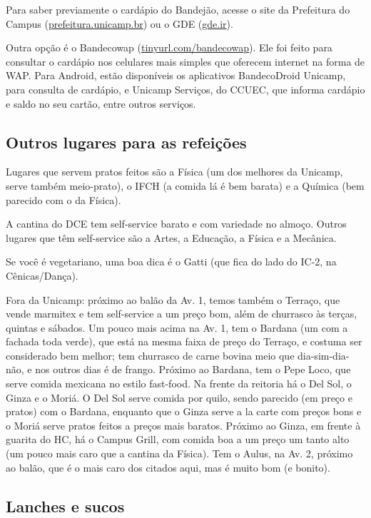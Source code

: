 Para saber previamente o cardápio do Bandejão, acesse o site da Prefeitura do
Campus (\url{prefeitura.unicamp.br}) ou o GDE (\url{gde.ir}).

Outra opção é o Bandecowap (\url{tinyurl.com/bandecowap}). Ele foi feito
para consultar o cardápio nos celulares mais simples que oferecem internet na forma
de WAP. Para Android, estão disponíveis os aplicativos BandecoDroid Unicamp,
para consulta de cardápio, e Unicamp Serviços, do CCUEC, que informa cardápio
e saldo no seu cartão, entre outros serviços.

\subsection{Outros lugares para as refeições}

Lugares que servem pratos feitos são a Física (um dos melhores da Unicamp, serve
também meio-prato), o IFCH (a comida lá é bem barata) e a Química (bem parecido
com o da Física).

A cantina do DCE tem self-service barato e com variedade no almoço. Outros
lugares que têm self-service são a Artes, a Educação, a Física e a Mecânica.

Se você é vegetariano, uma boa dica é o Gatti (que fica do lado do IC-2, na
Cênicas/Dança).

Fora da Unicamp: próximo ao balão da Av. 1, temos também o Terraço, que vende
marmitex e tem self-service a um preço bom, além de churrasco às terças, quintas
e sábados. Um pouco mais acima na Av. 1, tem o Bardana (um com a fachada toda
verde), que está na mesma faixa de preço do Terraço, e costuma ser considerado
bem melhor; tem churrasco de carne bovina meio que dia-sim-dia-não, e nos outros
dias é de frango. Próximo ao Bardana, tem o Pepe Loco, que serve comida mexicana
no estilo fast-food. Na frente da reitoria há o Del Sol, o Ginza e o Moriá.
O Del Sol serve comida por quilo, sendo parecido (em preço e pratos) com
o Bardana, enquanto que o Ginza serve a la carte com preços bons e o Moriá serve pratos feitos a preços mais baratos. Próximo ao
Ginza, em frente à guarita do HC, há o Campus Grill, com comida boa a um preço
um tanto alto (um pouco mais caro que a cantina da Física). Tem o Aulus, na Av.
2, próximo ao balão, que é o mais caro dos citados aqui, mas é muito bom (e
bonito).

\subsection{Lanches e sucos}

